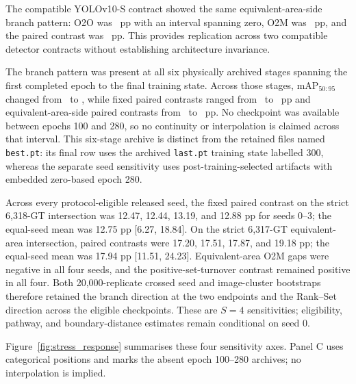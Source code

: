 The compatible YOLOv10-S contract showed the same equivalent-area-side branch pattern: O2O was \YtenOtwoOPP\ pp with an interval spanning zero, O2M was \YtenOtwoMPP\ pp, and the paired contrast was \YtenPairedPP\ pp. This provides replication across two compatible detector contracts without establishing architecture invariance.

The branch pattern was present at all six physically archived stages spanning the first completed epoch to the final training state. Across those stages, $\mathrm{mAP}_{50:95}$ changed from \DynamicsMapLow\ to \DynamicsMapHigh, while fixed paired contrasts ranged from \DynamicsFixedPairedLowPP\ to \DynamicsFixedPairedHighPP\ pp and equivalent-area-side paired contrasts from \DynamicsNormPairedLowPP\ to \DynamicsNormPairedHighPP\ pp. No checkpoint was available between epochs 100 and 280, so no continuity or interpolation is claimed across that interval. This six-stage archive is distinct from the retained files named \texttt{best.pt}: its final row uses the archived \texttt{last.pt} training state labelled 300, whereas the separate seed sensitivity uses post-training-selected artifacts with embedded zero-based epoch 280.

Across every protocol-eligible released seed, the fixed paired contrast on the strict 6,318-GT intersection was 12.47, 12.44, 13.19, and 12.88 pp for seeds 0--3; the equal-seed mean was 12.75 pp [6.27, 18.84]. On the strict 6,317-GT equivalent-area intersection, paired contrasts were 17.20, 17.51, 17.87, and 19.18 pp; the equal-seed mean was 17.94 pp [11.51, 24.23]. Equivalent-area O2M gaps were negative in all four seeds, and the positive-set-turnover contrast remained positive in all four. Both 20,000-replicate crossed seed and image-cluster bootstraps therefore retained the branch direction at the two endpoints and the Rank--Set direction across the eligible checkpoints. These are $S=4$ sensitivities; eligibility, pathway, and boundary-distance estimates remain conditional on seed 0.

Figure~\ref{fig:stress_response} summarises these four sensitivity axes. Panel C uses categorical positions and marks the absent epoch 100--280 archives; no interpolation is implied.

